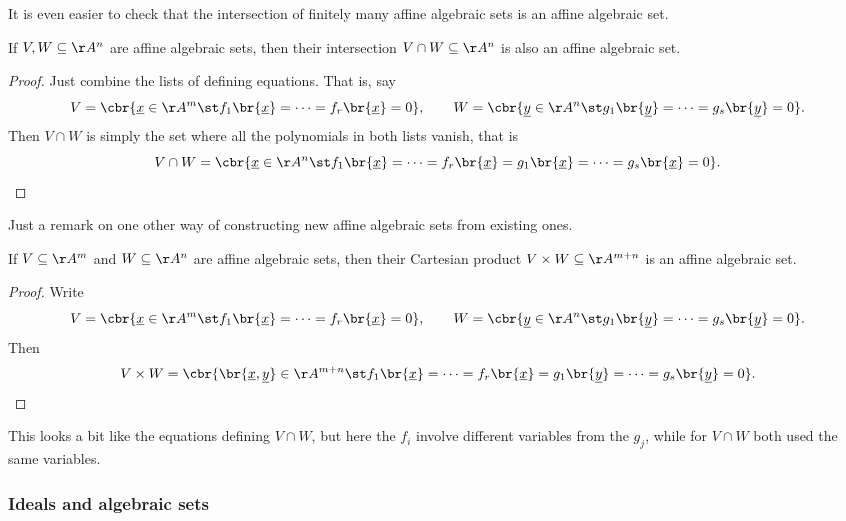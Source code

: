 \pagebreak

It is even easier to check that the intersection of finitely many affine algebraic sets is an affine algebraic set.

\begin{lemma}
If $ V, W \subseteq \AA^n $ are affine algebraic sets, then their intersection $ V \cap W \subseteq \AA^n $ is also an affine algebraic set.
\end{lemma}

\begin{proof}
Just combine the lists of defining equations. That is, say
$$ V = \cbr{\underline{x} \in \AA^m \st f_1\br{\underline{x}} = \dots = f_r\br{\underline{x}} = 0}, \qquad W = \cbr{\underline{y} \in \AA^n \st g_1\br{\underline{y}} = \dots = g_s\br{\underline{y}} = 0}. $$
Then $ V \cap W $ is simply the set where all the polynomials in both lists vanish, that is
$$ V \cap W = \cbr{\underline{x} \in \AA^n \st f_1\br{\underline{x}} = \dots = f_r\br{\underline{x}} = g_1\br{\underline{x}} = \dots = g_s\br{\underline{x}} = 0}. $$
\end{proof}

Just a remark on one other way of constructing new affine algebraic sets from existing ones.

\begin{lemma}
If $ V \subseteq \AA^m $ and $ W \subseteq \AA^n $ are affine algebraic sets, then their Cartesian product $ V \times W \subseteq \AA^{m + n} $ is an affine algebraic set.
\end{lemma}

\begin{proof}
Write
$$ V = \cbr{\underline{x} \in \AA^m \st f_1\br{\underline{x}} = \dots = f_r\br{\underline{x}} = 0}, \qquad W = \cbr{\underline{y} \in \AA^n \st g_1\br{\underline{y}} = \dots = g_s\br{\underline{y}} = 0}. $$
Then
$$ V \times W = \cbr{\br{\underline{x}, \underline{y}} \in \AA^{m + n} \st f_1\br{\underline{x}} = \dots = f_r\br{\underline{x}} = g_1\br{\underline{y}} = \dots = g_s\br{\underline{y}} = 0}. $$
\end{proof}

This looks a bit like the equations defining $ V \cap W $, but here the $ f_i $ involve different variables from the $ g_j $, while for $ V \cap W $ both used the same variables.

\subsubsection{Ideals and algebraic sets}

